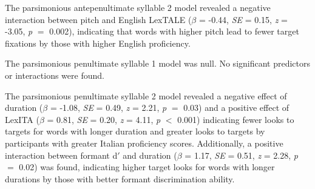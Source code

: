 The parsimonious antepenultimate syllable 2 model revealed a negative interaction between pitch and English LexTALE ($\beta$ = -0.44, \textit{SE} = 0.15, \textit{z} = -3.05, \textit{p} $=$ 0.002), indicating that words with higher pitch lead to fewer target fixations by those with higher English proficiency. 

The parsimonious penultimate syllable 1 model was null. No significant predictors or interactions were found.

The parsimonious penultimate syllable 2 model revealed a negative effect of duration ($\beta$ = -1.08, \textit{SE} = 0.49, \textit{z} = 2.21, \textit{p} $=$ 0.03) and a positive effect of LexITA ($\beta$ = 0.81, \textit{SE} = 0.20, \textit{z} = 4.11, \textit{p} $<$ 0.001) indicating fewer looks to targets for words with longer duration and greater looks to targets by participants with greater Italian proficiency scores. Additionally, a positive interaction between formant d$'$ and duration ($\beta$ = 1.17, \textit{SE} = 0.51, \textit{z} = 2.28, \textit{p} $=$ 0.02) was found, indicating higher target looks for words with longer durations by those with better formant discrimination ability. 



